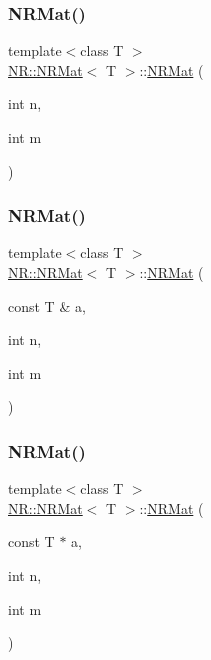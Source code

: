 \mbox{\label{classNR_1_1NRMat_a52799868d76fb74a2d73b8d8291a9215}} 
\subsubsection{\texorpdfstring{NRMat()}{NRMat()}\hspace{0.1cm}{\footnotesize\ttfamily [2/15]}}
{\footnotesize\ttfamily template$<$class T $>$ \\
\mbox{\hyperlink{classNR_1_1NRMat}{N\+R\+::\+N\+R\+Mat}}$<$ T $>$\+::\mbox{\hyperlink{classNR_1_1NRMat}{N\+R\+Mat}} (\begin{DoxyParamCaption}\item[{int}]{n,  }\item[{int}]{m }\end{DoxyParamCaption})}

\mbox{\label{classNR_1_1NRMat_a31a0ecf81920c576b25e3c49bfa5e444}} 
\subsubsection{\texorpdfstring{NRMat()}{NRMat()}\hspace{0.1cm}{\footnotesize\ttfamily [3/15]}}
{\footnotesize\ttfamily template$<$class T $>$ \\
\mbox{\hyperlink{classNR_1_1NRMat}{N\+R\+::\+N\+R\+Mat}}$<$ T $>$\+::\mbox{\hyperlink{classNR_1_1NRMat}{N\+R\+Mat}} (\begin{DoxyParamCaption}\item[{const T \&}]{a,  }\item[{int}]{n,  }\item[{int}]{m }\end{DoxyParamCaption})}

\mbox{\label{classNR_1_1NRMat_a30ddcc485a9e735b1fafbb56022fdc3a}} 
\subsubsection{\texorpdfstring{NRMat()}{NRMat()}\hspace{0.1cm}{\footnotesize\ttfamily [4/15]}}
{\footnotesize\ttfamily template$<$class T $>$ \\
\mbox{\hyperlink{classNR_1_1NRMat}{N\+R\+::\+N\+R\+Mat}}$<$ T $>$\+::\mbox{\hyperlink{classNR_1_1NRMat}{N\+R\+Mat}} (\begin{DoxyParamCaption}\item[{const T $\ast$}]{a,  }\item[{int}]{n,  }\item[{int}]{m }\end{DoxyParamCaption})}

